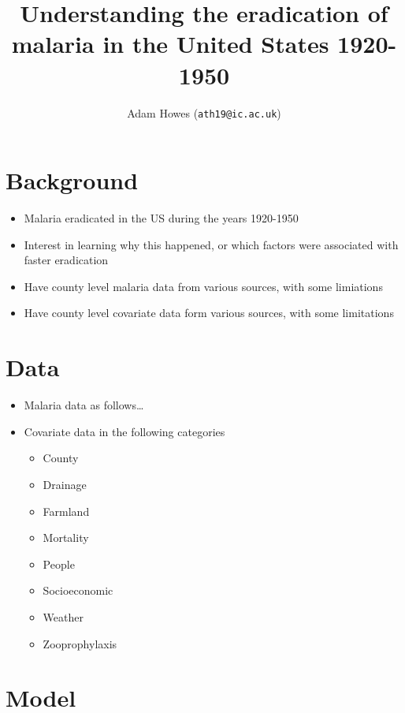 \documentclass[
]{article}
\title{Understanding the eradication of malaria in the United States
1920-1950}
\subtitle{Adam Howes (\texttt{ath19@ic.ac.uk})}
\author{}
\date{\vspace{-2.5em}}
\providecommand{\tightlist}{%
  \setlength{\itemsep}{0pt}\setlength{\parskip}{0pt}}
\begin{document}
\maketitle

\hypertarget{background}{%
\section{Background}\label{background}}

\begin{itemize}
\tightlist
\item
  Malaria eradicated in the US during the years 1920-1950
\item
  Interest in learning why this happened, or which factors were
  associated with faster eradication
\item
  Have county level malaria data from various sources, with some
  limiations
\item
  Have county level covariate data form various sources, with some
  limitations
\end{itemize}

\hypertarget{data}{%
\section{Data}\label{data}}

\begin{itemize}
\tightlist
\item
  Malaria data as follows\ldots{}
\item
  Covariate data in the following categories

  \begin{itemize}
  \tightlist
  \item
    County
  \item
    Drainage
  \item
    Farmland
  \item
    Mortality
  \item
    People
  \item
    Socioeconomic
  \item
    Weather
  \item
    Zooprophylaxis
  \end{itemize}
\end{itemize}

\hypertarget{model}{%
\section{Model}\label{model}}
\end{document}
